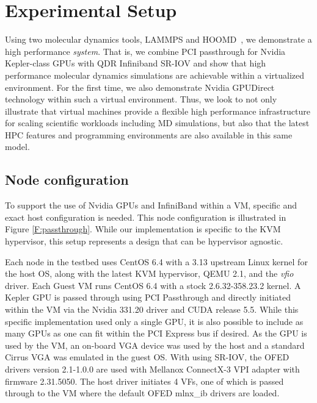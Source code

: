 \documentclass[10pt]{sigplanconf}
\begin{document}
\section{Experimental Setup}\label{setup}

Using two molecular dynamics tools, LAMMPS\cite{plimpton2007lammps} and HOOMD~\cite{anderson2010hoomd}, we demonstrate a high performance \textit{system}.  That is, we combine PCI passthrough for Nvidia Kepler-class GPUs with QDR Infiniband SR-IOV and show that high performance molecular dynamics simulations are achievable within a virtualized environment. 
For the first time, we also demonstrate Nvidia GPUDirect technology within such a virtual environment.  Thus, we look to not only illustrate that virtual machines provide a flexible high performance infrastructure for scaling scientific workloads including MD simulations, but also that the latest HPC features and programming environments are also available in this same model.   

\subsection{Node configuration}



To support the use of Nvidia GPUs and InfiniBand within a VM, specific and exact host configuration is needed. This node configuration is illustrated in Figure \ref{F:passthrough}.  While our implementation is specific to the KVM hypervisor, this setup represents a design that can be hypervisor agnostic.


Each node in the testbed uses CentOS 6.4 with a 3.13 upstream Linux kernel for the host OS, along with the latest KVM hypervisor, QEMU 2.1, and the \emph{vfio} driver.  Each Guest VM runs CentOS 6.4 with a stock 2.6.32-358.23.2 kernel. A Kepler GPU is passed through using PCI Passthrough and directly initiated within the VM via the Nvidia 331.20 driver and CUDA release 5.5. While this specific implementation used only a single GPU, it is also possible to include as many GPUs as one can fit within the PCI Express bus if desired. As the GPU is used by the VM, an on-board VGA device was used by the host and a standard Cirrus VGA was emulated in the guest OS. 
With using SR-IOV, the OFED drivers version 2.1-1.0.0 are used with Mellanox ConnectX-3 VPI adapter with firmware 2.31.5050.  The host driver initiates 4 VFs, one of which is passed through to the VM where the default OFED mlnx\_ib drivers are loaded.  
\end{document}
